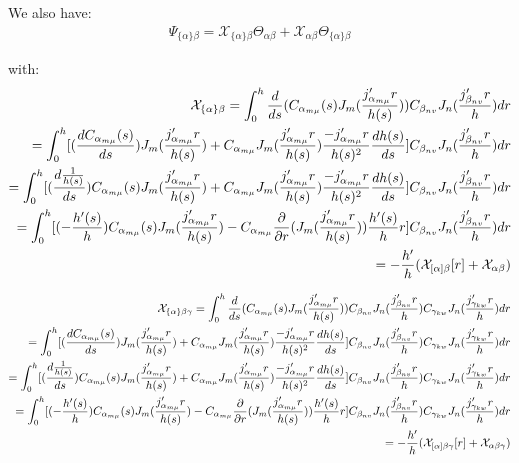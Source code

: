 \documentclass{Note}
\begin{document}
We also have:
\begin{equation}
\begin{aligned}
\Psi_{\{\alpha\}\beta}=\mathcal{X}_{\{\alpha\}\beta}\Theta_{\alpha\beta}+\mathcal{X}_{\alpha\beta}\Theta_{\{\alpha\}\beta}
\end{aligned}
\end{equation}

with:
\begin{equation}
\begin{aligned}
\mathcal{X}_{\{\alpha\}\beta}=\int_0^h {d\over ds}(C_{\alpha_{m\mu}}(s) J_m({j'_{\alpha_{m\mu}}r\over h(s)}))C_{\beta_{nv}} J_n({j'_{\beta_{nv}}r\over h})dr\\
=\int_0^h [({dC_{\alpha_{m\mu}}(s)\over ds})J_m({j'_{\alpha_{m\mu}}r\over h(s)})+
C_{\alpha_{m\mu}} J_m({j'_{\alpha_{m\mu}}r\over h(s)}) {-j'_{\alpha_{m\mu}}r\over h(s)^2}{dh(s)\over ds}]C_{\beta_{nv}} J_n({j'_{\beta_{nv}}r\over h})dr\\
=\int_0^h [({d{1\over h(s)}\over ds}){C_{\alpha_{m\mu}}(s)} J_m({j'_{\alpha_{m\mu}}r\over h(s)})+
C_{\alpha_{m\mu}} J_m({j'_{\alpha_{m\mu}}r\over h(s)}) {-j'_{\alpha_{m\mu}}r\over h(s)^2}{dh(s)\over ds}]C_{\beta_{nv}} J_n({j'_{\beta_{nv}}r\over h})dr\\
=\int_0^h [(-{h'(s)\over h}){C_{\alpha_{m\mu}}(s) } J_m({j'_{\alpha_{m\mu}}r\over h(s)})-
C_{\alpha_{m\mu}} {\partial \over \partial r}(J_m({j'_{\alpha_{m\mu}}r\over h(s)})) {h'(s)\over h}r]C_{\beta_{nv}} J_n({j'_{\beta_{nv}}r\over h})dr\\
=-{h'\over h}(\mathcal{X}_{[\alpha]\beta}[r]+\mathcal{X}_{\alpha\beta})
\end{aligned}
\end{equation}

\begin{equation}
\begin{aligned}
\mathcal{X}_{\{\alpha\}\beta\gamma}=\int_0^h {d\over ds}(C_{\alpha_{m\mu}}(s) J_m({j'_{\alpha_{m\mu}}r\over h(s)}))C_{\beta_{nv}} J_n({j'_{\beta_{nv}}r\over h})C_{\gamma_{kw}} J_n({j'_{\gamma_{kw}}r\over h})dr\\
=\int_0^h [({dC_{\alpha_{m\mu}}(s)\over ds})J_m({j'_{\alpha_{m\mu}}r\over h(s)})+
C_{\alpha_{m\mu}} J_m({j'_{\alpha_{m\mu}}r\over h(s)}) {-j'_{\alpha_{m\mu}}r\over h(s)^2}{dh(s)\over ds}]C_{\beta_{nv}} J_n({j'_{\beta_{nv}}r\over h})C_{\gamma_{kw}} J_n({j'_{\gamma_{kw}}r\over h})dr\\
=\int_0^h [({d{1\over h(s)}\over ds}){C_{\alpha_{m\mu}}(s)} J_m({j'_{\alpha_{m\mu}}r\over h(s)})+
C_{\alpha_{m\mu}} J_m({j'_{\alpha_{m\mu}}r\over h(s)}) {-j'_{\alpha_{m\mu}}r\over h(s)^2}{dh(s)\over ds}]C_{\beta_{nv}} J_n({j'_{\beta_{nv}}r\over h})C_{\gamma_{kw}} J_n({j'_{\gamma_{kw}}r\over h})dr\\
=\int_0^h [(-{h'(s)\over h}){C_{\alpha_{m\mu}}(s) } J_m({j'_{\alpha_{m\mu}}r\over h(s)})-
C_{\alpha_{m\mu}} {\partial \over \partial r}(J_m({j'_{\alpha_{m\mu}}r\over h(s)})) {h'(s)\over h}r]C_{\beta_{nv}} J_n({j'_{\beta_{nv}}r\over h})C_{\gamma_{kw}} J_n({j'_{\gamma_{kw}}r\over h})dr\\
=-{h'\over h}(\mathcal{X}_{[\alpha]\beta\gamma}[r]+\mathcal{X}_{\alpha\beta\gamma})
\end{aligned}
\end{equation}
\end{document}
